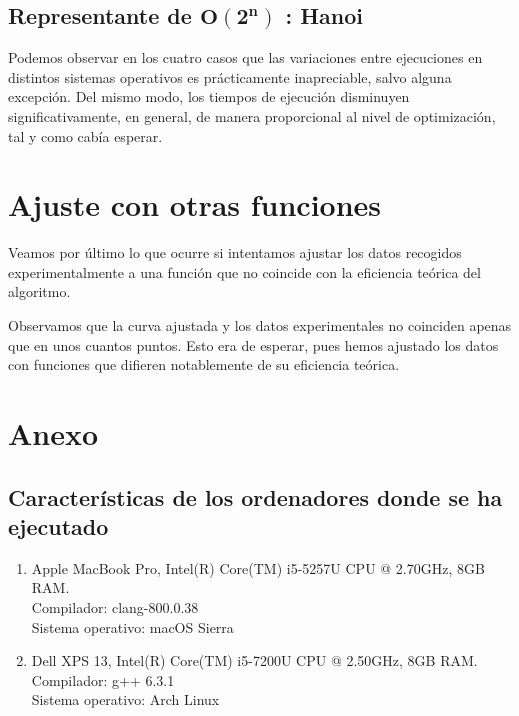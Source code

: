\documentclass[11pt]{article}
\begin{document}
\subsection*{Representante de $\boldsymbol{O(2^n)}$ : Hanoi}



Podemos observar en los cuatro casos que las variaciones entre ejecuciones en distintos sistemas operativos es prácticamente inapreciable, salvo alguna excepción. Del mismo modo, los tiempos de ejecución disminuyen significativamente, en general, de manera proporcional al nivel de optimización, tal y como cabía esperar.

\newpage

\section*{Ajuste con otras funciones}

Veamos por último lo que ocurre si intentamos ajustar los datos recogidos experimentalmente a una función que no coincide con la eficiencia teórica del algoritmo.


\fontsize{11pt}{7.2}\selectfont
Observamos que la curva ajustada y los datos experimentales no coinciden apenas que en unos cuantos puntos. Esto era de esperar, pues hemos ajustado los datos con funciones que difieren notablemente de su eficiencia teórica.

\newpage

\section*{Anexo}
\subsection*{Características de los ordenadores donde se ha ejecutado}

\vspace{0.5em}

\begin{enumerate}
\item Apple MacBook Pro, Intel(R) Core(TM) i5-5257U CPU @ 2.70GHz, 8GB RAM.\\  Compilador: clang-800.0.38 \\
  Sistema operativo: macOS Sierra
\item Dell XPS 13, Intel(R) Core(TM) i5-7200U CPU @ 2.50GHz, 8GB RAM.\\
  Compilador: g++ 6.3.1\\
  Sistema operativo: Arch Linux
\end{enumerate}
\end{document}
